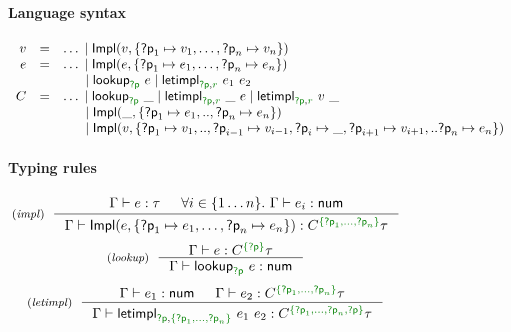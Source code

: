 \begin{figure}[h!]  
\paragraph{Language syntax}

\begin{equation*}
\begin{array}{rcl}
v &=& \ldots \sep \ident{Impl}(v, \{ \ident{?p}_1\mapsto v_1, \ldots, \ident{?p}_n\mapsto v_n\}) \\
e &=& \ldots \sep \ident{Impl}(e, \{\ident{?p}_1\mapsto e_1, \ldots, \ident{?p}_n\mapsto e_n\}) \\
  && \hspace{1.4em} \sep \ident{lookup}_{\cclrd{\ident{?p}}}~e \sep \ident{letimpl}_{\cclrd{\ident{?p}}, \cclrd{r}}~e_1~e_2\\
C &=& \ldots \sep \ident{lookup}_{\cclrd{\ident{?p}}}~\_ \sep \ident{letimpl}_{\cclrd{\ident{?p}}, \cclrd{r}}~\_~e \sep \ident{letimpl}_{\cclrd{\ident{?p}}, \cclrd{r}}~v~\_ \\
  && \hspace{1.4em} \sep \ident{Impl}(\_, \{ \ident{?p}_1\mapsto e_1, .., \ident{?p}_n\mapsto e_n\})\\
  && \hspace{1.4em} \sep \ident{Impl}(v, \{ \ident{?p}_1 \mapsto v_1, .., \ident{?p}_{i-1} \mapsto v_{i-1}, \ident{?p}_i \mapsto \_, \ident{?p}_{i+1} \mapsto v_{i+1}, .. \ident{?p}_n \mapsto e_n\})
\end{array}  
\end{equation*}

\vspace{1em}
\paragraph{Typing rules}

\begin{equation*}
  \hspace{-2em}
\tyrule{impl}
  { \Gamma \vdash e:\tau & \forall i\in\{ 1 \ldots n \}. ~ \Gamma \vdash e_i : \ident{num}}
  { \Gamma \vdash \ident{Impl}(e, \{ \ident{?p}_1\mapsto e_1, \ldots, \ident{?p}_n\mapsto e_n \}) : \ctyp{\cclrd{ \{ \ident{?p}_1, \ldots, \ident{?p}_n \}}}{\tau} }
\end{equation*}
\begin{equation*}
  \hspace{-2em}
\tyrule{lookup}
  { \Gamma \vdash e : \ctyp{\cclrd{ \{\ident{?p}\} }}{\tau} }
  { \Gamma \vdash \ident{lookup}_{\cclrd{\ident{?p}}}~e : \ident{num} }
\end{equation*}
\begin{equation*}
  \hspace{-2em}
\tyrule{letimpl}
  { \Gamma \vdash e_1 : \ident{num} &
    \Gamma \vdash e_2 : \ctyp{\cclrd{ \{ \ident{?p}_1, \ldots, \ident{?p}_n \} }}{\tau} }
  { \Gamma \vdash \ident{letimpl}_{\cclrd{\ident{?p}}, \cclrd{ \{ \ident{?p}_1, \ldots, \ident{?p}_n \} }}~e_1~e_2 : 
      \ctyp{\cclrd{ \{ \ident{?p}_1, \ldots, \ident{?p}_n, \ident{?p} \} }}{\tau} }
\end{equation*}


\end{figure}
